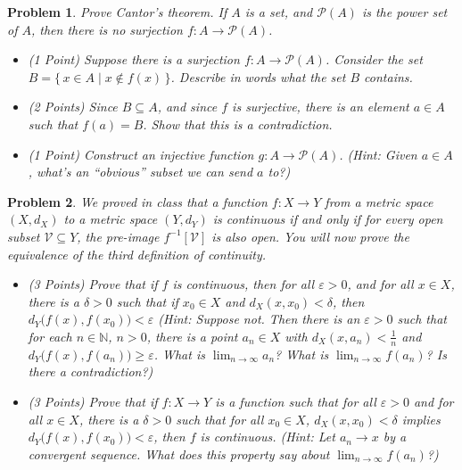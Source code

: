\documentclass{article}
\theoremstyle{normal}
\newtheorem{problem}{Problem}
\begin{document}
    \begin{problem}
        Prove Cantor's theorem. If $A$ is a set, and $\mathcal{P}(A)$ is the
        power set of $A$, then there is no surjection
        $f:A\rightarrow\mathcal{P}(A)$.
        \begin{itemize}
            \item (1 Point) Suppose there is a surjection
                $f:A\rightarrow\mathcal{P}(A)$. Consider the set
                $B=\{\,x\in{A}\;|\;x\notin{f}(x)\,\}$. Describe in words what
                the set $B$ contains.
            \item (2 Points) Since $B\subseteq{A}$, and since $f$ is surjective,
                there is an element $a\in{A}$ such that $f(a)=B$. Show that
                this is a contradiction.
            \item (1 Point) Construct an injective function
                $g:A\rightarrow\mathcal{P}(A)$. (Hint: Given $a\in{A}$, what's
                an ``obvious'' subset we can send $a$ to?)
        \end{itemize}
    \end{problem}
    \begin{problem}
        We proved in class that a function
        $f:X\rightarrow{Y}$ from a metric space $(X,d_{X})$ to a metric space
        $(Y,d_{Y})$ is continuous if and only if for every open subset
        $\mathcal{V}\subseteq{Y}$, the pre-image $f^{-1}[\mathcal{V}]$ is also
        open. You will now prove the equivalence of the third definition of
        continuity.
        \begin{itemize}
            \item (3 Points) Prove that if $f$ is continuous, then
                for all $\varepsilon>0$, and for all $x\in{X}$, there is a
                $\delta>0$ such that if $x_{0}\in{X}$ and
                $d_{X}(x,x_{0})<\delta$,
                then $d_{Y}\big(f(x),f(x_{0})\big)<\varepsilon$
                (Hint: Suppose not. Then there is an $\varepsilon>0$ such that
                for each $n\in\mathbb{N}$, $n>0$,
                there is a point $a_{n}\in{X}$ with $d_{X}(x,a_{n})<\frac{1}{n}$
                and $d_{Y}\big(f(x),f(a_{n})\big)\geq\varepsilon$. What is
                $\lim_{n\rightarrow\infty}a_{n}$? What is
                $\lim_{n\rightarrow\infty}f(a_{n})$? Is there a contradiction?)
            \item (3 Points) Prove that if $f:X\rightarrow{Y}$ is a function
                such that for all $\varepsilon>0$ and for all $x\in{X}$, there
                is a $\delta>0$ such that for all $x_{0}\in{X}$,
                $d_{X}(x,x_{0})<\delta$ implies
                $d_{Y}\big(f(x),f(x_{0})\big)<\varepsilon$, then $f$ is
                continuous. (Hint: Let $a_{n}\rightarrow{x}$ by a convergent
                sequence. What does this property say about
                $\lim_{n\rightarrow\infty}f(a_{n})$?)
        \end{itemize}
    \end{problem}
\end{document}
